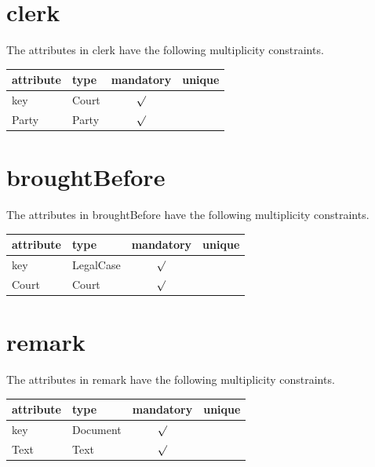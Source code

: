 \documentclass[10pt,a4paper]{report}              %
\theoremstyle{plain}\theorembodyfont{\rmfamily}\newtheorem{definition}{Definition}[section]
\theoremstyle{plain}\theorembodyfont{\rmfamily}\newtheorem{designrule}[definition]{Requirement}
\begin{document}
\section{clerk}

\label{sct:plug clerk}

The attributes in clerk have the following multiplicity constraints. 

\begin{center}
\begin{tabular}{llcc}
attribute & type & mandatory & unique\\
\hline
key  & Court & $\surd$ & \\
Party & Party & $\surd$ & \\
\end{tabular}
\end{center}

\section{broughtBefore}

\label{sct:plug broughtBefore}

The attributes in broughtBefore have the following multiplicity constraints. 

\begin{center}
\begin{tabular}{llcc}
attribute & type & mandatory & unique\\
\hline
key  & LegalCase & $\surd$ & \\
Court & Court & $\surd$ & \\
\end{tabular}
\end{center}

\section{remark}

\label{sct:plug remark}

The attributes in remark have the following multiplicity constraints. 

\begin{center}
\begin{tabular}{llcc}
attribute & type & mandatory & unique\\
\hline
key  & Document & $\surd$ & \\
Text & Text & $\surd$ & \\
\end{tabular}
\end{center}
\end{document}
